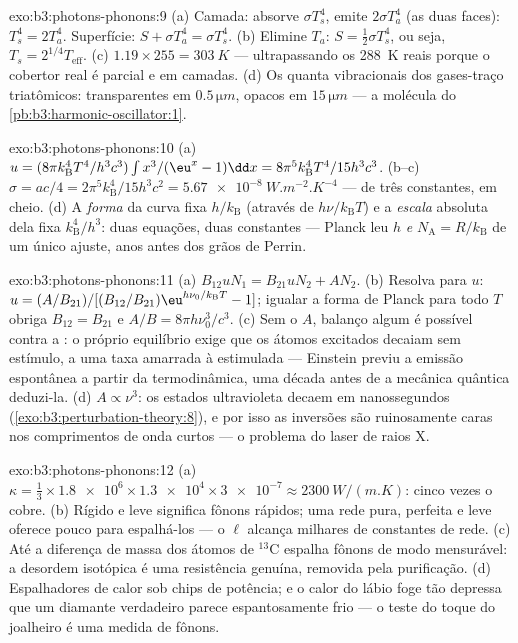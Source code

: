 \begin{solution}{exo:b3:photons-phonons:9}
(a) Camada: absorve $\sigma T_s^4$, emite $2\sigma T_a^4$ (as duas
faces): $T_s^4 = 2T_a^4$. Superfície: $S + \sigma T_a^4 = \sigma
T_s^4$. (b) Elimine $T_a$: $S = \tfrac12\sigma T_s^4$, ou seja,
$T_s = 2^{1/4}T_{\text{eff}}$. (c) $1.19 \times 255 =
\qty{303}{K}$ --- ultrapassando os \qty{288}{K} reais porque o
cobertor real é parcial e em camadas. (d) Os quanta vibracionais
dos gases-traço triatômicos: transparentes em $0.5\,\unit{\micro m}$,
opacos em $15\,\unit{\micro m}$ ---
a molécula do \cref{pb:b3:harmonic-oscillator:1}.
\end{solution}

\begin{solution}{exo:b3:photons-phonons:10}
(a) $u = (8\pi k_{\text{B}}^4T^4/h^3c^3)\int x^3/(\eu^x - 1)\dd x
= 8\pi^5k_{\text{B}}^4T^4/15h^3c^3$. (b--c) $\sigma = ac/4 =
2\pi^5k_{\text{B}}^4/15h^3c^2 = \qty{5.67e-8}{W.m^{-2}.K^{-4}}$
--- de três constantes, em cheio. (d) A \emph{forma} da curva
fixa $h/k_{\text{B}}$ (através de $h\nu/k_{\text{B}}T$) e a
\emph{escala} absoluta dela fixa $k_{\text{B}}^4/h^3$: duas equações,
duas constantes --- Planck leu $h$ \emph{e} $N_{\text{A}} =
R/k_{\text{B}}$ de um único ajuste, anos antes dos grãos de Perrin.
\end{solution}

\begin{solution}{exo:b3:photons-phonons:11}
(a) $B_{12}uN_1 = B_{21}uN_2 + AN_2$. (b) Resolva para $u$:
$u = (A/B_{21})/[(B_{12}/B_{21})\eu^{h\nu_0/k_{\text{B}}T} - 1]$;
igualar a forma de Planck para todo $T$ obriga $B_{12} = B_{21}$ e
$A/B = 8\pi h\nu_0^3/c^3$. (c) Sem o $A$, balanço algum é possível
contra a : o próprio equilíbrio exige que os átomos
excitados decaiam sem estímulo, a uma taxa amarrada à estimulada ---
Einstein previu a emissão espontânea a partir da termodinâmica, uma
década antes de a mecânica quântica deduzi-la. (d) $A \propto
\nu^3$: os estados ultravioleta decaem em nanossegundos
(\cref{exo:b3:perturbation-theory:8}), e por isso as inversões são
ruinosamente caras nos comprimentos de onda curtos --- o problema do
laser de raios X.
\end{solution}

\begin{solution}{exo:b3:photons-phonons:12}
(a) $\kappa = \tfrac13 \times \num{1.8e6} \times \num{1.3e4}
\times \num{3e-7} \approx \qty{2300}{W/(m.K)}$: cinco vezes o
cobre. (b) Rígido e leve significa fônons rápidos; uma rede pura,
perfeita e leve oferece pouco para espalhá-los --- o $\ell$ alcança
milhares de constantes de rede. (c) Até a diferença de massa dos
átomos de $^{13}$C espalha fônons de modo mensurável: a desordem
isotópica é uma resistência genuína, removida pela purificação. (d)
Espalhadores de calor sob chips de potência; e o calor do lábio foge
tão depressa que um diamante verdadeiro parece espantosamente frio ---
o teste do toque do joalheiro é uma medida de fônons.
\end{solution}


